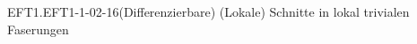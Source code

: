 \begin{DEF}{EFT1.EFT1-1-02-16}{(Differenzierbare) (Lokale) Schnitte in lokal trivialen Faserungen}

\end{DEF}
